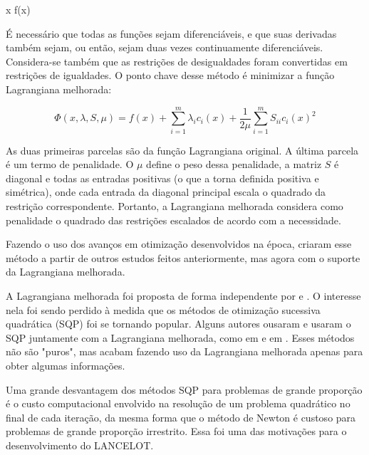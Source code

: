 \vspace{-15pt}
\begin{mini!}
{x}{ f(x) \label{lancelot_obj}}{\label{prob_lancelot}}{}
\end{mini!}

É necessário que todas as funções sejam diferenciáveis, e que suas derivadas também
sejam, ou então, sejam duas vezes continuamente diferenciáveis. Considera-se também
que as restrições de desigualdades foram convertidas em restrições de igualdades. O
ponto chave desse método é minimizar a função Lagrangiana melhorada:

\vspace{-15pt}
\begin{equation}
  \Phi(x, \lambda, S, \mu) = f(x) + \sum_{i=1}^{m} \lambda_i c_i(x) + \frac{1}{2\mu} \sum_{i=1}^m S_{ii} c_i(x)^2
\end{equation}

As duas primeiras parcelas são da função Lagrangiana original. A última parcela é um termo
de penalidade. O \(\mu\) define o peso dessa penalidade, a matriz \(S\) é diagonal e todas
as entradas positivas (o que a torna definida positiva e simétrica), onde cada entrada
da diagonal principal escala o quadrado da restrição correspondente. Portanto, a Lagrangiana
melhorada considera como penalidade o quadrado das restrições escalados de acordo com a
necessidade.

Fazendo o uso dos avanços em otimização desenvolvidos na época, criaram esse método a partir
de outros estudos feitos anteriormente, mas agora com o suporte da Lagrangiana melhorada.

A Lagrangiana melhorada foi proposta de forma independente por \cite{hestenes1969multiplier}
e \cite{powell1969method}. O interesse nela foi sendo perdido à medida que os métodos
de otimização sucessiva quadrática (SQP) foi se tornando popular. Alguns autores ousaram e
usaram o SQP juntamente com a Lagrangiana melhorada, como em \cite{schittkowski1982nonlinear}
e em \cite{gill1986some}. Esses métodos não são "puros", mas acabam fazendo uso da Lagrangiana
melhorada apenas para obter algumas informações.

Uma grande desvantagem dos métodos SQP para problemas de grande proporção é o custo computacional
envolvido na resolução de um problema quadrático no final de cada iteração, da mesma forma que
o método de Newton é custoso para problemas de grande proporção irrestrito. Essa foi uma das
motivações para o desenvolvimento do LANCELOT.

